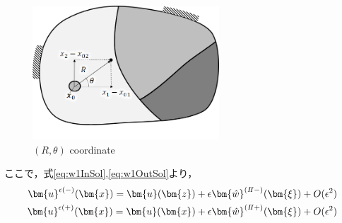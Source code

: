 \begin{figure}[ht]
	\begin{center}
		\includegraphics[height=5cm]{./figures/Rtheta.png}
		\caption{$(R,\theta)$ coordinate}
		\label{fig:Rtheta}
	\end{center}
\end{figure}
ここで，式\eqref{eq:w1InSol},\eqref{eq:w1OutSol}より，
\begin{align}
	\bm{u}^{\epsilon(-)}(\bm{x})=\bm{u}(\bm{z})
		+\epsilon\bm{\hat{w}}^{(I\hspace{-.15em}I-)}(\bm{\xi})+O(\epsilon^2)
	\nonumber
	\\
	\bm{u}^{\epsilon(+)}(\bm{x})=\bm{u}(\bm{x})
		+\epsilon\bm{\hat{w}}^{(I\hspace{-.15em}I+)}(\bm{\xi})+O(\epsilon^2)
\end{align}
